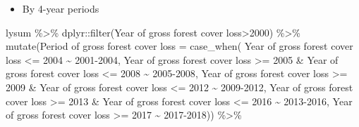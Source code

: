 \documentclass[10pt,landscape,a3paper]{article}
\newenvironment{Shaded}{\begin{snugshade}}{\end{snugshade}}
\newcommand{\AttributeTok}[1]{\textcolor[rgb]{0.77,0.63,0.00}{#1}}
\newcommand{\DecValTok}[1]{\textcolor[rgb]{0.00,0.00,0.81}{#1}}
\newcommand{\FunctionTok}[1]{\textcolor[rgb]{0.00,0.00,0.00}{#1}}
\newcommand{\NormalTok}[1]{#1}
\newcommand{\OtherTok}[1]{\textcolor[rgb]{0.56,0.35,0.01}{#1}}
\newcommand{\SpecialCharTok}[1]{\textcolor[rgb]{0.00,0.00,0.00}{#1}}
\newcommand{\StringTok}[1]{\textcolor[rgb]{0.31,0.60,0.02}{#1}}
\providecommand{\tightlist}{%
\setlength{\itemsep}{0pt}\setlength{\parskip}{0pt}}
\begin{document}
\begin{itemize}
\tightlist
\item
  By 4-year periods
\end{itemize}

\begin{Shaded}
\begin{Highlighting}[]
\NormalTok{lysum }\SpecialCharTok{\%\textgreater{}\%}\NormalTok{ dplyr}\SpecialCharTok{::}\FunctionTok{filter}\NormalTok{(}\StringTok{\textasciigrave{}}\AttributeTok{Year of gross forest cover loss}\StringTok{\textasciigrave{}}\SpecialCharTok{\textgreater{}}\DecValTok{2000}\NormalTok{) }\SpecialCharTok{\%\textgreater{}\%} 
  \FunctionTok{mutate}\NormalTok{(}\StringTok{\textasciigrave{}}\AttributeTok{Period of gross forest cover loss}\StringTok{\textasciigrave{}} \OtherTok{=} \FunctionTok{case\_when}\NormalTok{(}
    \StringTok{\textasciigrave{}}\AttributeTok{Year of gross forest cover loss}\StringTok{\textasciigrave{}} \SpecialCharTok{\textless{}=} \DecValTok{2004} \SpecialCharTok{\textasciitilde{}} \StringTok{\textquotesingle{}2001{-}2004\textquotesingle{}}\NormalTok{,}
    \StringTok{\textasciigrave{}}\AttributeTok{Year of gross forest cover loss}\StringTok{\textasciigrave{}} \SpecialCharTok{\textgreater{}=} \DecValTok{2005} \SpecialCharTok{\&}
      \StringTok{\textasciigrave{}}\AttributeTok{Year of gross forest cover loss}\StringTok{\textasciigrave{}} \SpecialCharTok{\textless{}=} \DecValTok{2008} \SpecialCharTok{\textasciitilde{}} \StringTok{\textquotesingle{}2005{-}2008\textquotesingle{}}\NormalTok{,}
    \StringTok{\textasciigrave{}}\AttributeTok{Year of gross forest cover loss}\StringTok{\textasciigrave{}} \SpecialCharTok{\textgreater{}=} \DecValTok{2009} \SpecialCharTok{\&}
      \StringTok{\textasciigrave{}}\AttributeTok{Year of gross forest cover loss}\StringTok{\textasciigrave{}} \SpecialCharTok{\textless{}=} \DecValTok{2012} \SpecialCharTok{\textasciitilde{}} \StringTok{\textquotesingle{}2009{-}2012\textquotesingle{}}\NormalTok{,}
    \StringTok{\textasciigrave{}}\AttributeTok{Year of gross forest cover loss}\StringTok{\textasciigrave{}} \SpecialCharTok{\textgreater{}=} \DecValTok{2013} \SpecialCharTok{\&}
      \StringTok{\textasciigrave{}}\AttributeTok{Year of gross forest cover loss}\StringTok{\textasciigrave{}} \SpecialCharTok{\textless{}=} \DecValTok{2016} \SpecialCharTok{\textasciitilde{}} \StringTok{\textquotesingle{}2013{-}2016\textquotesingle{}}\NormalTok{,}
    \StringTok{\textasciigrave{}}\AttributeTok{Year of gross forest cover loss}\StringTok{\textasciigrave{}} \SpecialCharTok{\textgreater{}=} \DecValTok{2017} \SpecialCharTok{\textasciitilde{}} \StringTok{\textquotesingle{}2017{-}2018\textquotesingle{}}\NormalTok{)) }\SpecialCharTok{\%\textgreater{}\%} 

\end{Highlighting}
\end{Shaded}
\end{document}

